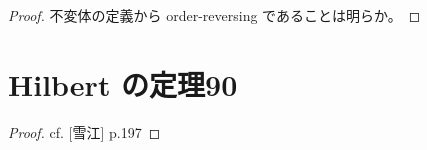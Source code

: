 \documentclass[report]{jlreq}
\begin{document}
\begin{proof}
    不変体の定義から order-reversing であることは明らか。
    \TODO{}
\end{proof}

%
\section{Hilbert の定理90}

\begin{proof}
    cf. [雪江] p.197
\end{proof}

\begin{theorem}
\end{theorem}

\begin{definition}
    \TODO{}
\end{definition}

\begin{theorem}
    \TODO{}
\end{theorem}
\end{document}
